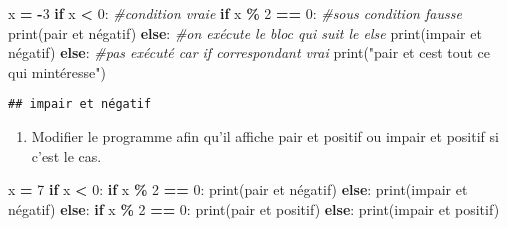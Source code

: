 \documentclass[
]{book}
\newenvironment{Shaded}{\begin{snugshade}}{\end{snugshade}}
\newcommand{\BuiltInTok}[1]{#1}
\newcommand{\CommentTok}[1]{\textcolor[rgb]{0.56,0.35,0.01}{\textit{#1}}}
\newcommand{\ControlFlowTok}[1]{\textcolor[rgb]{0.13,0.29,0.53}{\textbf{#1}}}
\newcommand{\DecValTok}[1]{\textcolor[rgb]{0.00,0.00,0.81}{#1}}
\newcommand{\NormalTok}[1]{#1}
\newcommand{\OperatorTok}[1]{\textcolor[rgb]{0.81,0.36,0.00}{\textbf{#1}}}
\newcommand{\StringTok}[1]{\textcolor[rgb]{0.31,0.60,0.02}{#1}}
\providecommand{\tightlist}{%
  \setlength{\itemsep}{0pt}\setlength{\parskip}{0pt}}
\def\tightlist{}
\begin{document}
\begin{Shaded}
\begin{Highlighting}[]
\NormalTok{x }\OperatorTok{=} \OperatorTok{{-}}\DecValTok{3}
\ControlFlowTok{if}\NormalTok{ x }\OperatorTok{\textless{}} \DecValTok{0}\NormalTok{: }\CommentTok{\#condition vraie}
  \ControlFlowTok{if}\NormalTok{ x }\OperatorTok{\%} \DecValTok{2} \OperatorTok{==} \DecValTok{0}\NormalTok{: }\CommentTok{\#sous condition fausse}
    \BuiltInTok{print}\NormalTok{(}\StringTok{\textquotesingle{}pair et négatif\textquotesingle{}}\NormalTok{)}
  \ControlFlowTok{else}\NormalTok{:  }\CommentTok{\#on exécute le bloc qui suit le else}
    \BuiltInTok{print}\NormalTok{(}\StringTok{\textquotesingle{}impair et négatif\textquotesingle{}}\NormalTok{)}
\ControlFlowTok{else}\NormalTok{: }\CommentTok{\#pas exécuté car if correspondant vrai}
    \BuiltInTok{print}\NormalTok{(}\StringTok{"pair et c\textquotesingle{}est tout ce qui m\textquotesingle{}intéresse"}\NormalTok{)}
\end{Highlighting}
\end{Shaded}

\begin{verbatim}
## impair et négatif
\end{verbatim}

\begin{enumerate}
\def\labelenumi{\arabic{enumi}.}
\setcounter{enumi}{2}
\tightlist
\item
  Modifier le programme afin qu'il affiche pair et positif ou impair et positif si c'est le cas.
\end{enumerate}

\begin{Shaded}
\begin{Highlighting}[]
\NormalTok{x }\OperatorTok{=} \DecValTok{7}
\ControlFlowTok{if}\NormalTok{ x }\OperatorTok{\textless{}} \DecValTok{0}\NormalTok{: }
    \ControlFlowTok{if}\NormalTok{ x }\OperatorTok{\%} \DecValTok{2} \OperatorTok{==} \DecValTok{0}\NormalTok{: }
        \BuiltInTok{print}\NormalTok{(}\StringTok{\textquotesingle{}pair et négatif\textquotesingle{}}\NormalTok{)}
    \ControlFlowTok{else}\NormalTok{:  }
        \BuiltInTok{print}\NormalTok{(}\StringTok{\textquotesingle{}impair et négatif\textquotesingle{}}\NormalTok{)}
\ControlFlowTok{else}\NormalTok{: }
        \ControlFlowTok{if}\NormalTok{ x }\OperatorTok{\%} \DecValTok{2} \OperatorTok{==} \DecValTok{0}\NormalTok{: }
            \BuiltInTok{print}\NormalTok{(}\StringTok{\textquotesingle{}pair et positif\textquotesingle{}}\NormalTok{)}
        \ControlFlowTok{else}\NormalTok{:  }
            \BuiltInTok{print}\NormalTok{(}\StringTok{\textquotesingle{}impair et positif\textquotesingle{}}\NormalTok{)}
\end{Highlighting}
\end{Shaded}
\end{document}
